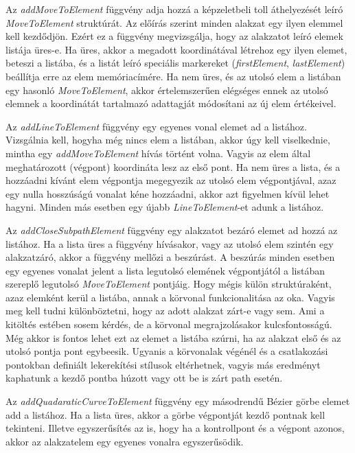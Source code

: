 \documentclass[12pt]{report}
\theoremstyle{definition}
\newcommand{\func}[1]{{\textsl{#1}}}
\begin{document}
Az \func{addMoveToElement} függvény adja hozzá a képzeletbeli toll áthelyezését
leíró \func{MoveToElement} struktúrát. Az előírás szerint minden alakzat egy
ilyen elemmel kell kezdődjön. Ezért ez a függvény megvizsgálja, hogy az
alakzatot leíró elemek listája üres-e. Ha üres, akkor a megadott koordinátával
létrehoz egy ilyen elemet, beteszi a listába, és a listát leíró speciális
markereket (\func{firstElement}, \func{lastElement}) beállítja erre az elem
memóriacímére. Ha nem üres, és az utolsó elem a listában egy hasonló
\func{MoveToElement}, akkor értelemszerűen elégséges ennek az utolsó elemnek a
koordinátát tartalmazó adattagját módosítani az új elem értékeivel.

Az \func{addLineToElement} függvény egy egyenes vonal elemet ad a listához.
Vizsgálnia kell, hogyha még nincs elem a listában, akkor úgy kell viselkednie,
mintha egy \func{addMoveToElement} hívás történt volna. Vagyis az elem által
meghatározott (végpont) koordináta lesz az első pont. Ha nem üres a lista, és a
hozzáadni kívánt elem végpontja megegyezik az utolsó elem végpontjával, azaz
egy nulla hosszúságú vonalat kéne hozzáadni, akkor azt figyelmen kívül lehet
hagyni. Minden más esetben egy újabb \func{LineToElement}-et adunk a listához.

Az \func{addCloseSubpathElement} függvény egy alakzatot bezáró elemet ad hozzá
az listához. Ha a lista üres a függvény hívásakor, vagy az utolsó elem szintén
egy alakzatzáró, akkor a függvény mellőzi a beszúrást. A beszúrás minden
esetben egy egyenes vonalat jelent a lista legutolsó elemének végpontjától a
listában szereplő legutolsó \func{MoveToElement} pontjáig. Hogy mégis külön
struktúraként, azaz elemként kerül a listába, annak a körvonal funkcionalitása
az oka. Vagyis meg kell tudni különböztetni, hogy az adott alakzat zárt-e vagy
sem. Ami a kitöltés estében sosem kérdés, de a körvonal megrajzolásakor
kulcsfontosságú. Még akkor is fontos lehet ezt az elemet a listába szúrni, ha
az alakzat első és az utolsó pontja pont egybeesik. Ugyanis a körvonalak
végénél és a csatlakozási pontokban definiált lekerekítési stílusok
eltérhetnek, vagyis más eredményt kaphatunk a kezdő pontba húzott vagy ott be
is zárt path esetén.

Az \func{addQuadaraticCurveToElement} függvény egy másodrendű Bézier görbe
elemet add a listához. Ha a lista üres, akkor a görbe végpontját kezdő pontnak
kell tekinteni. Illetve egyszerűsítés az is, hogy ha a kontrollpont és a
végpont azonos, akkor az alakzatelem egy egyenes vonalra egyszerűsödik.
\end{document}
